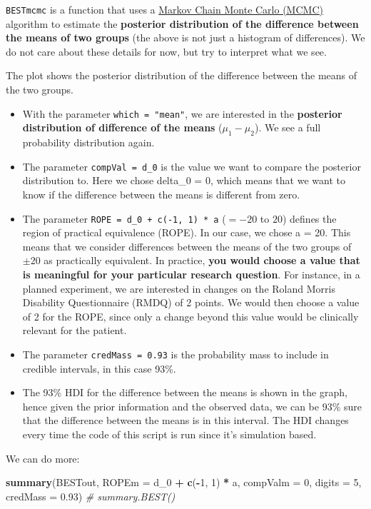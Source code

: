 \documentclass[
]{book}
\newenvironment{Shaded}{\begin{snugshade}}{\end{snugshade}}
\newcommand{\AttributeTok}[1]{\textcolor[rgb]{0.13,0.29,0.53}{#1}}
\newcommand{\CommentTok}[1]{\textcolor[rgb]{0.56,0.35,0.01}{\textit{#1}}}
\newcommand{\DecValTok}[1]{\textcolor[rgb]{0.00,0.00,0.81}{#1}}
\newcommand{\FloatTok}[1]{\textcolor[rgb]{0.00,0.00,0.81}{#1}}
\newcommand{\FunctionTok}[1]{\textcolor[rgb]{0.13,0.29,0.53}{\textbf{#1}}}
\newcommand{\NormalTok}[1]{#1}
\newcommand{\SpecialCharTok}[1]{\textcolor[rgb]{0.81,0.36,0.00}{\textbf{#1}}}
\begin{document}
\texttt{BESTmcmc} is a function that uses a \href{https://en.wikipedia.org/wiki/Markov_chain_Monte_Carlo}{Markov Chain Monte Carlo (MCMC)}
algorithm to estimate the \textbf{posterior distribution of the difference between the means of two groups}
(the above is not just a histogram of differences).
We do not care about these details for now, but try to interpret what we see.

The plot shows the posterior distribution of the difference between the means of the two groups.

\begin{itemize}
\item
  With the parameter \texttt{which\ =\ "mean"}, we are interested in the \textbf{posterior distribution of
  difference of the means} (\(\mu_1 - \mu_2\)). We see a full probability distribution again.
\item
  The parameter \texttt{compVal\ =\ d\_0} is the value we want to compare the posterior distribution to. Here we
  chose delta\_0 = 0, which means that we want to know if the difference between the means is
  different from zero.
\item
  The parameter \texttt{ROPE\ =\ d\_0\ +\ c(-1,\ 1)\ *\ a} (\(= -20\) to \(20\)) defines the region of practical equivalence (ROPE).
  In our case, we chose a = 20. This means that we consider differences between the means of the two groups
  of \(\pm 20\) as practically equivalent. In practice, \textbf{you would choose a value that is meaningful for your
  particular research question}. For instance, in a planned experiment, we are interested in changes
  on the Roland Morris Disability Questionnaire (RMDQ) of 2 points.
  We would then choose a value of 2 for the ROPE, since only a change beyond this value would be
  clinically relevant for the patient.
\item
  The parameter \texttt{credMass\ =\ 0.93} is the probability mass to include in credible intervals, in this case 93\%.
\item
  The 93\% HDI for the difference between the means is shown in the graph, hence given
  the prior information and the observed data, we can be 93\% sure that the
  difference between the means is in this interval. The HDI changes every time the code of this
  script is run since it's simulation based.
\end{itemize}

We can do more:

\begin{Shaded}
\begin{Highlighting}[]
\FunctionTok{summary}\NormalTok{(BESTout, }\AttributeTok{ROPEm =}\NormalTok{ d\_0 }\SpecialCharTok{+} \FunctionTok{c}\NormalTok{(}\SpecialCharTok{{-}}\DecValTok{1}\NormalTok{, }\DecValTok{1}\NormalTok{) }\SpecialCharTok{*}\NormalTok{ a, }\AttributeTok{compValm =} \DecValTok{0}\NormalTok{,}
        \AttributeTok{digits =} \DecValTok{5}\NormalTok{, }\AttributeTok{credMass =} \FloatTok{0.93}\NormalTok{) }\CommentTok{\# summary.BEST()}
\end{Highlighting}
\end{Shaded}
\end{document}
